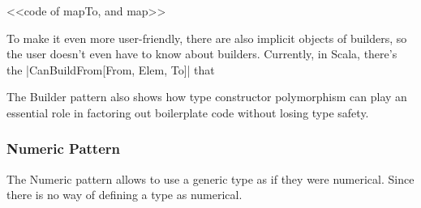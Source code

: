<<code of mapTo, and map>>


To make it even more user-friendly, there are also implicit objects of builders, so the user doesn't even have to know about builders. Currently, in Scala, there's the |CanBuildFrom[From, Elem, To]| that 

The Builder pattern also shows how type constructor polymorphism can play an essential role in factoring out boilerplate code without losing type safety.\cite{adriaan}

\subsubsection{Numeric Pattern}

The Numeric pattern allows to use a generic type as if they were numerical.
Since there is no way of defining a type as numerical.
